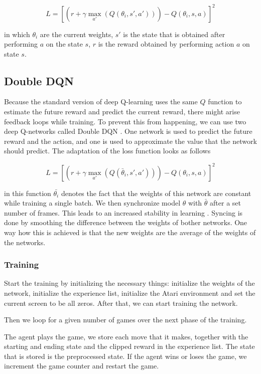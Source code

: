\documentclass{article}
\begin{document}
\[
	L = \left[\left(r + \gamma \max_{a'}( Q(\theta_i, s',a'))\right) - Q(\theta_i, s, a)\right]^2
\]

in which $\theta_i$ are the current weights, $s'$ is the state that is obtained after performing $a$ on the state $s$, $r$ is the reward obtained by performing action $a$ on state $s$.

\subsection{Double DQN} \label{sec:doubleDQN}

Because the standard version of deep Q-learning uses the same $Q$ function to estimate the future reward and predict the current reward, there might arise feedback loops while training. To prevent this from happening, we can use two deep Q-networks called Double DQN \cite{van2016deep}. One network is used to predict the future reward and the action, and one is used to approximate the value that the network should predict. The adaptation of the loss function looks as follows

\[
	L = \left[\left(r + \gamma \max_{a'}( Q(\bar\theta_i, s',a'))\right) - Q(\theta_i, s, a)\right]^2
\]

in this function $\bar{\theta_i}
$ denotes the fact that the weights of this network are constant while training a single batch. 
We then synchronize model $\theta$ with $\bar\theta$ after a set number of frames. This leads to an increased stability in learning \cite{van2016deep}. Syncing is done by smoothing the difference between the weights of bother networks. One way how this is achieved is that the new weights are the average of the weights of the networks.


\subsubsection{Training}\label{chapter:training}

Start the training by initializing the necessary things: initialize the weights of the network, initialize the experience list, initialize the Atari environment and set the current screen to be all zeros. After that, we can start training the network. 

Then we loop for a given number of games over the next phase of the training. 

The agent plays the game, we store each move that it makes, together with the starting and ending state and the clipped reward in the experience list. The state that is stored is the preprocessed state. If the agent wins or loses the game, we increment the game counter and restart the game. 
\end{document}
